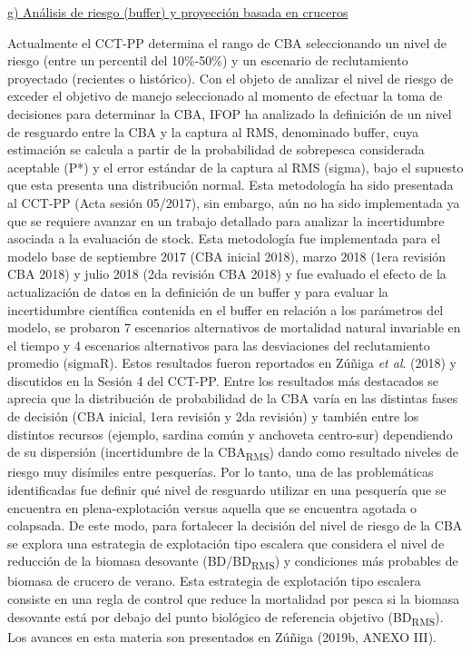 \documentclass[
  spanish,
]{article}
\begin{document}
\vspace{0.3cm}

\underline{g) Análisis de riesgo (buffer) y proyección basada en cruceros}

Actualmente el CCT-PP determina el rango de CBA seleccionando un nivel
de riesgo (entre un percentil del 10\%-50\%) y un escenario de
reclutamiento proyectado (recientes o histórico). Con el objeto de
analizar el nivel de riesgo de exceder el objetivo de manejo
seleccionado al momento de efectuar la toma de decisiones para
determinar la CBA, IFOP ha analizado la definición de un nivel de
resguardo entre la CBA y la captura al RMS, denominado buffer, cuya
estimación se calcula a partir de la probabilidad de sobrepesca
considerada aceptable (P*) y el error estándar de la captura al RMS
(sigma), bajo el supuesto que esta presenta una distribución normal.
Esta metodología ha sido presentada al CCT-PP (Acta sesión 05/2017), sin
embargo, aún no ha sido implementada ya que se requiere avanzar en un
trabajo detallado para analizar la incertidumbre asociada a la
evaluación de stock. Esta metodología fue implementada para el modelo
base de septiembre 2017 (CBA inicial 2018), marzo 2018 (1era revisión
CBA 2018) y julio 2018 (2da revisión CBA 2018) y fue evaluado el efecto
de la actualización de datos en la definición de un buffer y para
evaluar la incertidumbre científica contenida en el buffer en relación a
los parámetros del modelo, se probaron 7 escenarios alternativos de
mortalidad natural invariable en el tiempo y 4 escenarios alternativos
para las desviaciones del reclutamiento promedio (sigmaR). Estos
resultados fueron reportados en Zúñiga \emph{et al}. (2018) y discutidos
en la Sesión 4 del CCT-PP. Entre los resultados más destacados se
aprecia que la distribución de probabilidad de la CBA varía en las
distintas fases de decisión (CBA inicial, 1era revisión y 2da revisión)
y también entre los distintos recursos (ejemplo, sardina común y
anchoveta centro-sur) dependiendo de su dispersión (incertidumbre de la
CBA\textsubscript{RMS}) dando como resultado niveles de riesgo muy
disímiles entre pesquerías. Por lo tanto, una de las problemáticas
identificadas fue definir qué nivel de resguardo utilizar en una
pesquería que se encuentra en plena-explotación versus aquella que se
encuentra agotada o colapsada. De este modo, para fortalecer la decisión
del nivel de riesgo de la CBA se explora una estrategia de explotación
tipo escalera que considera el nivel de reducción de la biomasa
desovante (BD/BD\textsubscript{RMS}) y condiciones más probables de
biomasa de crucero de verano. Esta estrategia de explotación tipo
escalera consiste en una regla de control que reduce la mortalidad por
pesca si la biomasa desovante está por debajo del punto biológico de
referencia objetivo (BD\textsubscript{RMS}). Los avances en esta materia
son presentados en Zúñiga (2019b, ANEXO III).
\end{document}
